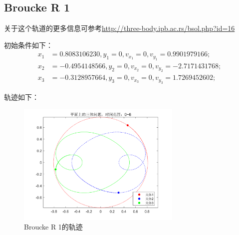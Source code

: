 \documentclass{article}
\begin{document}
\subsection{Broucke R 1 }
\par 关于这个轨道的更多信息可参考\url{http://three-body.ipb.ac.rs/bsol.php?id=16}
\par 初始条件如下：
\begin{align*}
	x_1 &= 0.8083106230, y_1 = 0,
	v_{x_1} = 0, v_{y_1} = 0.9901979166; \\
	x_2 &= -0.4954148566, y_2 = 0,
	v_{x_2} = 0, v_{y_2} = -2.7171431768;\\ 
	x_3 &= -0.3128957664, y_3 = 0,
	v_{x_3} = 0, v_{y_3} = 1.7269452602;
\end{align*}
\par 轨迹如下：
\begin{figure}[H]
	\centering  %
	\includegraphics[width=0.7\textwidth]{一些优美的周期解//Broucke R 1}
	\caption{Broucke R 1的轨迹}
	\label{Broucke_R_1}
\end{figure}
\end{document}
